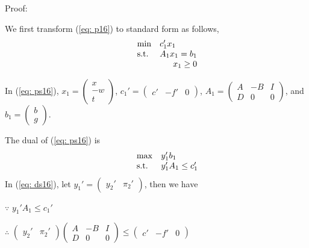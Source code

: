Proof:

We first transform (\ref{eq: p16}) to standard form as follows,
\begin{equation}
\label{eq: ps16}
  \begin{array}{lrcll}
    \min
    & \multicolumn{4}{l}{c_{1}'x_{1}} \\
    \text{s.t.}
    & A_{1}x_{1}= b_{1} \\
    & x_{1} \geq 0
  \end{array}
\end{equation}

In (\ref{eq: ps16}), $x_{1}=  \left( \begin{array}{c} x \\ -w \\ t \end{array}\right) $,  $c_{1}'= \left( \begin{array}{ccc} c' & -f' & 0 \end{array}\right) $, $A_{1} = \left( \begin{array}{ccc} A & -B & I \\ D & 0 & 0 \end{array}\right)$, and $b_{1}= \left( \begin{array}{c} b \\ g \end{array}\right)$.

The dual of (\ref{eq: ps16}) is
\begin{equation}
\label{eq: ds16}
  \begin{array}{lrcll}
    \max
    & \multicolumn{4}{l}{y_{1}'b_{1}} \\
    \text{s.t.}
    & y_{1}'A_{1}\leq c_{1}'
  \end{array}
\end{equation}
In (\ref{eq: ds16}), let  $y_{1}'= \left( \begin{array}{cc} y_{2}' & \pi _{2}' \end{array}\right) $, then we have

$\because$  $y_{1}'A_{1}\leq c_{1}'$

$\therefore$ $\left( \begin{array}{cc} y_{2}' & \pi _{2}' \end{array}\right)  \left( \begin{array}{ccc} A & -B & I \\ D & 0 & 0 \end{array}\right) \leq  \left( \begin{array}{ccc} c' & -f' & 0 \end{array}\right)$

